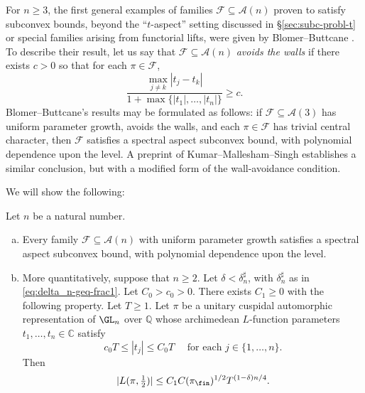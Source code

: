 For $n \geq 3$, the first general examples of families $\mathcal{F} \subseteq \mathcal{A}(n)$ proven to satisfy subconvex bounds, beyond the ``$t$-aspect'' setting discussed in \S\ref{sec:subc-probl-t} or special families arising from functorial lifts, were given by Blomer--Buttcane \cite{MR4203038, MR4039487}.  To describe their result, let us say that $\mathcal{F} \subseteq \mathcal{A}(n)$ \emph{avoids the walls} if there exists $c > 0$ so that for each $\pi \in \mathcal{F}$,
\begin{equation*}
  \frac{  \max_{j \neq k}|t_j - t_k|}{1 + \max \{|t_1|,\dotsc,|t_n|\}} \geq c.
\end{equation*}
Blomer--Buttcane's results may be formulated as follows: if $\mathcal{F} \subseteq \mathcal{A}(3)$ has uniform parameter growth, avoids the walls, and each $\pi \in \mathcal{F}$ has trivial central character, then $\mathcal{F}$ satisfies a spectral aspect subconvex bound, with polynomial dependence upon the level.  A preprint of Kumar--Mallesham--Singh \cite{2020arXiv200607819K} establishes a similar conclusion, but with a modified form of the wall-avoidance condition.

We will show the following:
\begin{theorem}\label{thm:main-result}
  Let $n$ be a natural number.
  \begin{enumerate}[(a)]
  \item \label{itm:standard:main-a} Every family $\mathcal{F} \subseteq \mathcal{A}(n)$ with uniform parameter growth satisfies a spectral aspect subconvex bound, with polynomial dependence upon the level.
  \item \label{itm:standard:main-b} More quantitatively, suppose that $n \geq 2$.  Let $\delta < \delta_n^\sharp$, with $\delta_n^\sharp$ as in \eqref{eq:delta_n-geq-frac1}.  Let $C_0 > c_0 > 0$.  There exists $C_1 \geq 0$ with the following property.  Let $T \geq 1$.  Let $\pi$ be a unitary cuspidal automorphic representation of $\GL_n$ over $\mathbb{Q}$ whose archimedean $L$-function parameters $t_1,\dotsc,t_n \in \mathbb{C}$ satisfy
    \begin{equation}\label{eq:c_1-t-leq}
      c_0 T \leq |t_j| \leq C_0 T \quad \text{ for each }  j \in \{1,\dotsc,n\}.
    \end{equation}
    Then
    \begin{equation}\label{eq:lpi-tfrac12-leq}
      |L(\pi, \tfrac{1}{2})| \leq C_1 C(\pi_{\fin})^{1/2} T^{(1-\delta)n/4}.
    \end{equation}
  \end{enumerate}
\end{theorem}

